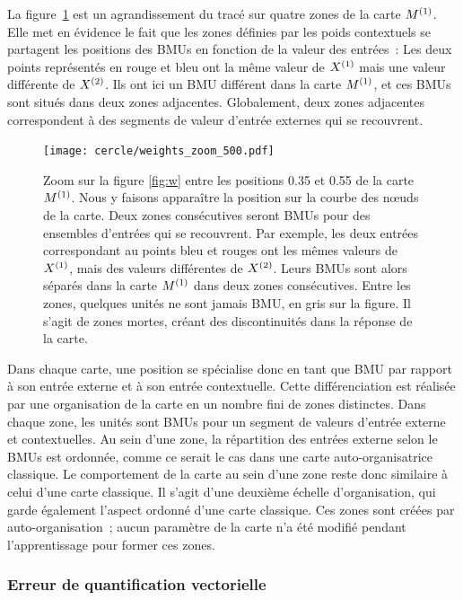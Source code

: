 \documentclass[../main]{subfiles}
\begin{document}
La figure~\ref{fig:w_zoom} est un agrandissement du tracé sur quatre zones de la carte $M^{({1})}$.
Elle met en évidence le fait que les zones définies par les poids contextuels se partagent les positions des BMUs en fonction de la valeur des entrées~:
Les deux points représentés en rouge et bleu ont la même valeur de $X^{({1})}$ mais une valeur différente de $X^{({2})}$. 
Ils ont ici un BMU différent dans la carte $M^{({1})}$, et ces BMUs sont situés dans deux zones adjacentes.
Globalement, deux zones adjacentes correspondent à des segments de valeur d'entrée externes qui se recouvrent.

\begin{figure}[h!]
	\centering\texttt{[image: cercle/weights\_zoom\_500.pdf]}
   \caption{Zoom sur la figure \ref{fig:w} entre les positions 0.35 et 0.55 de la carte $M^{({1})}$. 
   Nous y faisons apparaître la position sur la courbe des n\oe{}uds de la carte.
   Deux zones consécutives seront BMUs pour des ensembles d'entrées qui se recouvrent. Par exemple, les deux entrées correspondant au points bleu et rouges ont les mêmes valeurs de $X^{({1})}$, mais des valeurs différentes de $X^{({2})}$. Leurs BMUs sont alors séparés dans la carte $M^{({1})}$ dans deux zones consécutives.
   Entre les zones, quelques unités ne sont jamais BMU, en gris sur la figure. Il s'agit de zones mortes, créant des discontinuités dans la réponse de la carte.
   \label{fig:w_zoom}}
\end{figure}

Dans chaque carte, une position se spécialise donc en tant que BMU par rapport à son entrée externe et à son entrée contextuelle.
Cette différenciation est réalisée par une organisation de la carte en un nombre fini de zones distinctes. Dans chaque zone, les unités sont BMUs pour un segment de valeurs d'entrée externe et contextuelles. Au sein d'une zone, la répartition des entrées externe selon le BMUs est ordonnée, comme ce serait le cas dans une carte auto-organisatrice classique. Le comportement de la carte au sein d'une zone reste donc similaire à celui d'une carte classique.
Il s'agit d'une deuxième échelle d'organisation, qui garde également l'aspect ordonné d'une carte classique. 
Ces zones sont créées par auto-organisation~; aucun paramètre de la carte n'a été modifié pendant l'apprentissage pour former ces zones.

\subsubsection{Erreur de quantification vectorielle}
\end{document}
